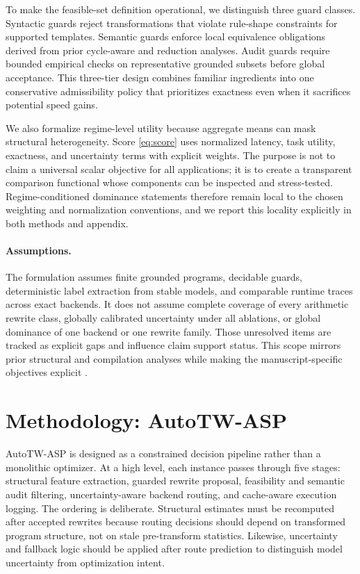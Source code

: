 \documentclass{article} %
\begin{document}
To make the feasible-set definition operational, we distinguish three guard classes. Syntactic guards reject transformations that violate rule-shape constraints for supported templates. Semantic guards enforce local equivalence obligations derived from prior cycle-aware and reduction analyses. Audit guards require bounded empirical checks on representative grounded subsets before global acceptance. This three-tier design combines familiar ingredients into one conservative admissibility policy that prioritizes exactness even when it sacrifices potential speed gains.

We also formalize regime-level utility because aggregate means can mask structural heterogeneity. Score \eqref{eq:score} uses normalized latency, task utility, exactness, and uncertainty terms with explicit weights. The purpose is not to claim a universal scalar objective for all applications; it is to create a transparent comparison functional whose components can be inspected and stress-tested. Regime-conditioned dominance statements therefore remain local to the chosen weighting and normalization conventions, and we report this locality explicitly in both methods and appendix.

\paragraph{Assumptions.}
The formulation assumes finite grounded programs, decidable guards, deterministic label extraction from stable models, and comparable runtime traces across exact backends. It does not assume complete coverage of every arithmetic rewrite class, globally calibrated uncertainty under all ablations, or global dominance of one backend or one rewrite family. Those unresolved items are tracked as explicit gaps and influence claim support status. This scope mirrors prior structural and compilation analyses while making the manuscript-specific objectives explicit \citep{src_002,src_003,src_039,src_045,src_048}.

\section{Methodology: AutoTW-ASP}
\label{sec:method}
AutoTW-ASP is designed as a constrained decision pipeline rather than a monolithic optimizer. At a high level, each instance passes through five stages: structural feature extraction, guarded rewrite proposal, feasibility and semantic audit filtering, uncertainty-aware backend routing, and cache-aware execution logging. The ordering is deliberate. Structural estimates must be recomputed after accepted rewrites because routing decisions should depend on transformed program structure, not on stale pre-transform statistics. Likewise, uncertainty and fallback logic should be applied after route prediction to distinguish model uncertainty from optimization intent.
\end{document}
